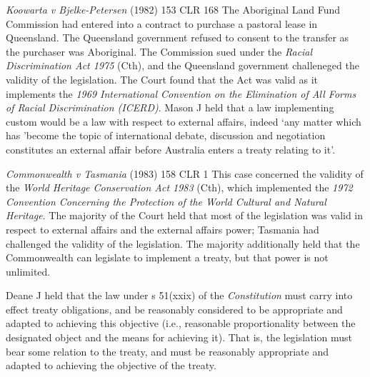 \begin{casedetails}{\textit{Koowarta v Bjelke-Petersen} (1982) 153 CLR 168}\label{case:Koowarta v Bjelke-Petersen}
    \flushleft
    The Aboriginal Land Fund Commission had entered into a contract to purchase a pastoral lease in Queensland. The Queensland government refused to consent to the transfer as the purchaser was Aboriginal. The Commission sued under the \textit{Racial Discrimination Act 1975} (Cth), and the Queensland government challeneged the validity of the legislation. The Court found that the Act was valid as it implements the \textit{1969 International Convention on the Elimination of All Forms of Racial Discrimination (ICERD)}. Mason J held that a law implementing custom would be a law with respect to external affairs, indeed `any matter which has 'become the topic of international debate, discussion and negotiation constitutes an external affair before Australia enters a treaty relating to it'.
\end{casedetails}

\begin{casedetails}{\textit{Commonwealth v Tasmania} (1983) 158 CLR 1}\label{case:Commonwealth v Tasmania}
    \flushleft
    This case concerned the validity of the \textit{World Heritage Conservation Act 1983} (Cth), which implemented the \textit{1972 Convention Concerning the Protection of the World Cultural and Natural Heritage}. The majority of the Court held that most of the legislation was valid in respect to external affairs and the external affairs power; Tasmania had challenged the validity of the legislation. The majority additionally held that the Commonwealth can legislate to implement a treaty, but that power is not unlimited.

    \vspace{\baselineskip}

    Deane J held that the law under s 51(xxix) of the \textit{Constitution} must carry into effect treaty obligations, and be reasonably considered to be appropriate and adapted to achieving this objective (i.e., reasonable proportionality between the designated object and the means for achieving it). That is, the legislation must bear some relation to the treaty, and must be reasonably appropriate and adapted to achieving the objective of the treaty.
\end{casedetails}

